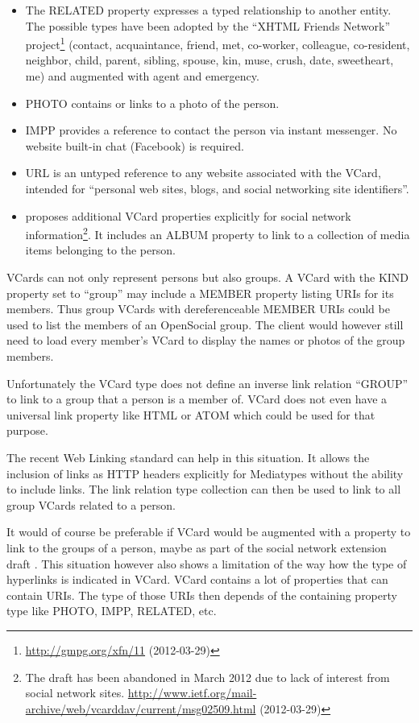 \documentclass[11pt,a4paper,headsepline,twoside]{scrartcl}		%
\newcommand{\citeurl}[2]{\url{#1} (#2)}
\begin{document}
\begin{itemize}
\item The RELATED property expresses a typed relationship to another entity. The
  possible types have been adopted by the ``XHTML Friends Network''
  project\footnote{\citeurl{http://gmpg.org/xfn/11}{2012-03-29}} (contact,
  acquaintance, friend, met, co-worker, colleague, co-resident, neighbor, child,
  parent, sibling, spouse, kin, muse, crush, date, sweetheart, me) and augmented
  with agent and emergency.
\item PHOTO contains or links to a photo of the person.
\item IMPP provides a reference to contact the person via instant messenger. No
  website built-in chat (Facebook) is required.
\item URL is an untyped reference to any website associated with the VCard,
  intended for ``personal web sites, blogs, and social networking site
  identifiers''.
\item \cite{George2011} proposes additional VCard properties explicitly for
  social network information\footnote{The draft has been abandoned in March 2012
    due to lack of interest from social network
    sites. \citeurl{http://www.ietf.org/mail-archive/web/vcarddav/current/msg02509.html}{2012-03-29}}. It
  includes an ALBUM property to link to a collection of media items belonging to
  the person.
\end{itemize}

VCards can not only represent persons but also groups. A VCard with the KIND
property set to ``group'' may include a MEMBER property listing URIs for its
members. Thus group VCards with dereferenceable MEMBER URIs could be used to
list the members of an OpenSocial group. The client would however still need to
load every member's VCard to display the names or photos of the group members.

Unfortunately the VCard type does not define an inverse link relation ``GROUP''
to link to a group that a person is a member of. VCard does not even have a
universal link property like HTML or ATOM which could be used for that purpose.

The recent Web Linking standard \cite{RFC5988} can help in this situation. It
allows the inclusion of links as HTTP headers explicitly for Mediatypes without
the ability to include links. The link relation type
collection \cite{Amundsen2012} can then be used to link to all group VCards
related to a person.

It would of course be preferable if VCard would be augmented with a property to
link to the groups of a person, maybe as part of the social network extension
draft \cite{George2011}. This situation however also shows a limitation of the
way how the type of hyperlinks is indicated in VCard. VCard contains a lot of
properties that can contain URIs. The type of those URIs then depends of the
containing property type like PHOTO, IMPP, RELATED, etc.
\end{document}
